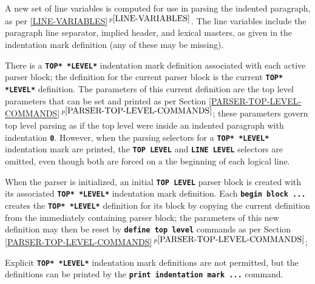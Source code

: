 \documentclass[12pt]{article}
\newcommand{\TT}[1]{{\tt \bfseries #1}}
\newcommand{\itemref}[1]{\ref{#1}$\,^{p\pageref{#1}}$}
\begin{document}
A new set of line variables is computed for use in parsing the
indented paragraph, as per \itemref{LINE-VARIABLES}.
The line variables include the paragraph line separator,
implied header, and lexical masters, as given in
the indentation mark definition (any of these may be missing).

There is a \TT{*TOP* *LEVEL*} indentation mark definition associated
with each active parser block; the definition for the current parser
block is the current \TT{*TOP* *LEVEL*} definition.
The parameters of this current definition are the top level parameters that
can be set and printed as per Section \itemref{PARSER-TOP-LEVEL-COMMANDS};
these parameters govern top level parsing as if the top level were inside
an indented paragraph with indentation \TT{0}.  However, when the
parsing selectors for a \TT{*TOP* *LEVEL*} indentation mark are
printed, the \TT{TOP LEVEL} and \TT{LINE LEVEL} selectors are omitted,
even though both are forced on a the beginning of each logical line.

When the parser is initialized, an initial \TT{TOP LEVEL} parser block
is created with its associated \TT{*TOP* *LEVEL*} indentation mark definition.
Each \TT{begin block ...} creates the \TT{*TOP* *LEVEL*} definition for
its block by copying the current definition from the immediately
containing parser block; the parameters of this new definition may
then be reset by \TT{define top level} commands as per
Section \itemref{PARSER-TOP-LEVEL-COMMANDS};

Explicit \TT{*TOP* *LEVEL*} indentation mark definitions are not permitted,
but the definitions can be printed by the \TT{print indentation mark ...}
command.
\end{document}
